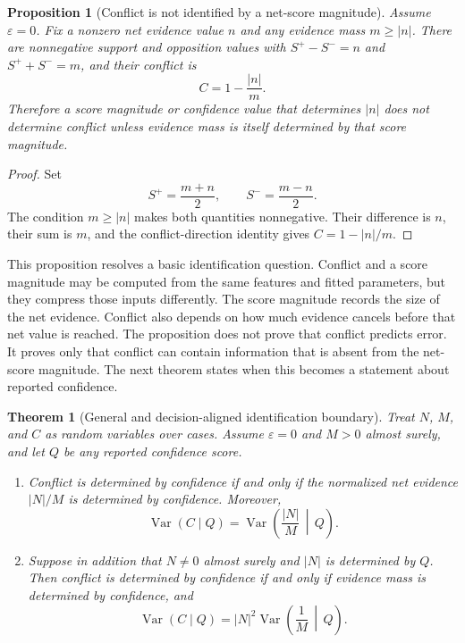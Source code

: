 \documentclass[11pt]{article}
\newtheorem{theorem}{Theorem}
\newtheorem{proposition}{Proposition}
\begin{document}
\begin{proposition}[Conflict is not identified by a net-score magnitude]
Assume $\varepsilon=0$. Fix a nonzero net evidence value $n$ and any evidence mass $m\geq |n|$. There are nonnegative support and opposition values with $S^+-S^-=n$ and $S^++S^-=m$, and their conflict is
\[
C=1-\frac{|n|}{m}.
\]
Therefore a score magnitude or confidence value that determines $|n|$ does not determine conflict unless evidence mass is itself determined by that score magnitude.
\end{proposition}

\begin{proof}
Set
\[
S^+=\frac{m+n}{2},
\qquad
S^-=\frac{m-n}{2}.
\]
The condition $m\geq |n|$ makes both quantities nonnegative. Their difference is $n$, their sum is $m$, and the conflict-direction identity gives $C=1-|n|/m$.
\end{proof}

This proposition resolves a basic identification question. Conflict and a
score magnitude may be computed from the same features and fitted parameters,
but they compress those inputs differently. The score magnitude records the
size of the net evidence. Conflict also depends on how much evidence cancels
before that net value is reached. The proposition does not prove that conflict
predicts error. It proves only that conflict can contain information that is
absent from the net-score magnitude. The next theorem states when this becomes
a statement about reported confidence.

\begin{theorem}[General and decision-aligned identification boundary]
Treat $N$, $M$, and $C$ as random variables over cases. Assume
$\varepsilon=0$ and $M>0$ almost surely, and let $Q$ be any reported
confidence score.

\begin{enumerate}
\item Conflict is determined by confidence if and only if the normalized net
evidence $|N|/M$ is determined by confidence. Moreover,
\[
\operatorname{Var}(C\mid Q)
=
\operatorname{Var}\!\left(\frac{|N|}{M}\,\middle|\,Q\right).
\]
\item Suppose in addition that $N\neq 0$ almost surely and $|N|$ is determined
by $Q$. Then conflict is determined by confidence if and only if evidence mass
is determined by confidence, and
\[
\operatorname{Var}(C\mid Q)
=
|N|^2\operatorname{Var}\!\left(\frac{1}{M}\,\middle|\,Q\right).
\]
\end{enumerate}
\end{theorem}
\end{document}
